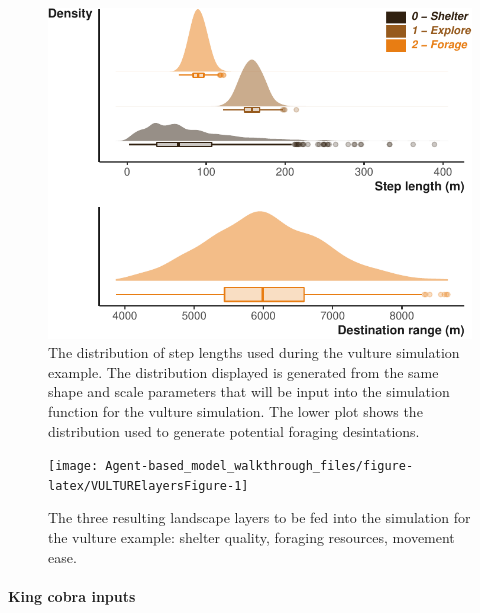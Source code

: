\documentclass[10pt,a4paper]{article}
\begin{document}
\begin{figure}

{\centering \includegraphics{Agent-based_model_walkthrough_files/figure-latex/VULTUREsettingMoveDesPlot-1} 

}

\caption{The distribution of step lengths used during the vulture simulation example. The distribution displayed is generated from the same shape and scale parameters that will be input into the simulation function for the vulture simulation. The lower plot shows the distribution used to generate potential foraging desintations.}\label{fig:VULTUREsettingMoveDesPlot}
\end{figure}

\begin{figure}

{\centering \texttt{[image: Agent-based\_model\_walkthrough\_files/figure-latex/VULTURElayersFigure-1]} 

}

\caption{The three resulting landscape layers to be fed into the simulation for the vulture example: shelter quality, foraging resources, movement ease.}\label{fig:VULTURElayersFigure}
\end{figure}

\hypertarget{king-cobra-inputs}{%
\paragraph{King cobra inputs}\label{king-cobra-inputs}}
\end{document}
